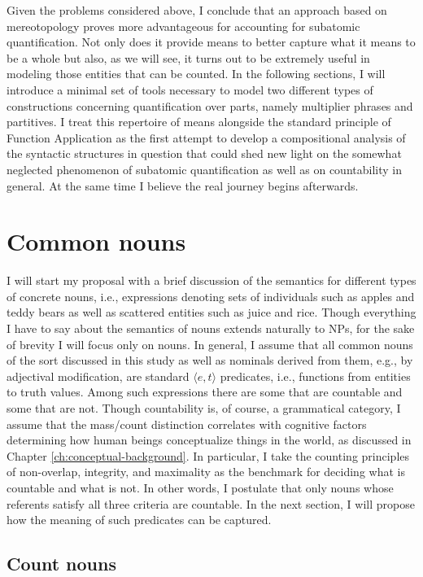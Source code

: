 	Given the problems considered above, I conclude that an approach based on mereotopology proves more advantageous for accounting for subatomic quantification. Not only does it provide means to better capture what it means to be a whole but also, as we will see, it turns out to be extremely useful in modeling those entities that can be counted. In the following sections, I will introduce a minimal set of tools necessary to model two different types of constructions concerning quantification over parts, namely multiplier phrases and partitives. I treat this repertoire of means alongside the standard principle of Function Application as the first attempt to develop a compositional analysis of the syntactic structures in question that could shed new light on the somewhat neglected phenomenon of subatomic quantification as well as on countability in general. At the same time I believe the real journey begins afterwards.    
	
	\section{Common nouns}\label{sec:common-nouns}\largerpage
	
	I will start my proposal with a brief discussion of the semantics for different types of concrete nouns, i.e., expressions denoting sets of individuals such as apples and teddy bears as well as scattered entities such as juice and rice. Though everything I have to say about the semantics of nouns extends naturally to NPs, for the sake of brevity I will focus only on nouns. In general, I assume that all common nouns of the sort discussed in this study as well as nominals derived from them, e.g., by adjectival modification, are standard $\langle e,t\rangle$ predicates, i.e., functions from entities to truth values. Among such expressions there are some that are countable and some that are not. Though countability is, of course, a grammatical category, I assume that the mass/count distinction correlates with cognitive factors determining how human beings conceptualize things in the world, as discussed in Chapter \ref{ch:conceptual-background}. In particular, I take the counting principles of non-overlap, integrity, and maximality as the benchmark for deciding what is countable and what is not. In other words, I postulate that only nouns whose referents satisfy all three criteria are countable. In the next section, I will propose how the meaning of such predicates can be captured.
	
	\subsection{Count nouns}\label{sec:count-nouns}
	
